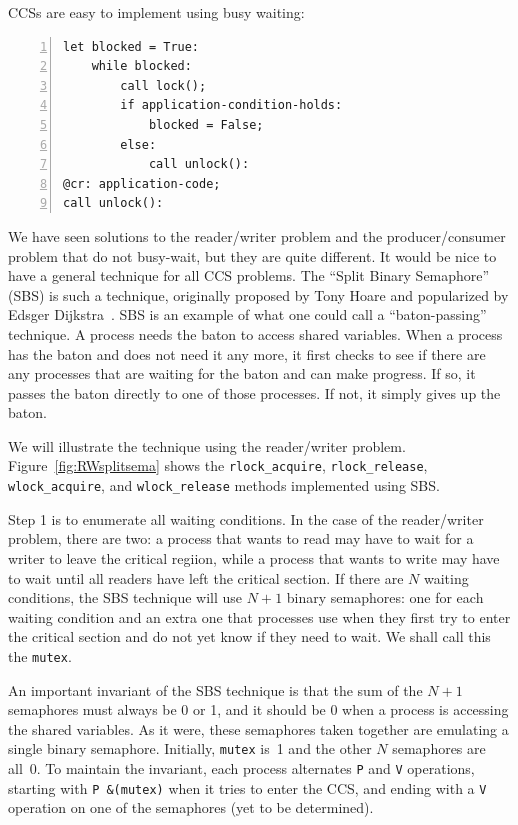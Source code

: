 \documentclass{report}
\newenvironment{code}{
\tcolorbox
}{
\endtcolorbox
}
\begin{document}
CCSs are easy to implement using busy waiting:
\begin{code}
\begin{Verbatim}[xleftmargin=5mm,numbers=left]
let blocked = True:
    while blocked:
        call lock();
        if application-condition-holds:
            blocked = False;
        else:
            call unlock():
@cr: application-code;
call unlock():
\end{Verbatim}
\end{code}

We have seen solutions to the reader/writer problem and the producer/consumer
problem that do not busy-wait, but they are quite different.  It would be nice
to have a general technique for all CCS problems.
The ``Split Binary Semaphore'' (SBS) is such a technique, originally proposed by
Tony Hoare and popularized by Edsger Dijkstra~\cite{EWD703}.
SBS is an example of what one could call a ``baton-passing'' technique.
A process needs the baton to access shared variables.
When a process has the baton and does not need it any more,
it first checks to see if there are any processes that are waiting for the
baton and can make progress.
If so, it passes the baton directly to one of those processes.
If not, it simply gives up the baton.

We will illustrate the technique using the reader/writer problem.
Figure~\ref{fig:RWsplitsema} shows the
\texttt{rlock\_acquire}, \texttt{rlock\_release},
\texttt{wlock\_acquire}, and \texttt{wlock\_release} methods implemented using
SBS.

Step 1 is to enumerate all waiting conditions.  In the case of the reader/writer
problem, there are two: a process that wants to read may have to wait for a
writer to leave the critical regiion, while a process that wants to write may
have to wait until all readers have left the critical section.  If there are $N$
waiting conditions, the SBS technique will use $N+1$ binary semaphores: one for
each waiting condition and an extra one that processes use when they first try
to enter the critical section and do not yet know if they need to wait.
We shall call this the \texttt{mutex}.

An important invariant of the SBS technique is that the sum of the $N+1$ semaphores
must always be 0 or 1, and it should be 0 when a process is accessing the shared
variables.
As it were, these semaphores taken together are emulating a single binary semaphore.
Initially, \texttt{mutex} is~1 and the other $N$ semaphores
are all~0.  To maintain the invariant, each process alternates \texttt{P} and
\texttt{V} operations, starting with \texttt{P~\&(mutex)} when it tries to
enter the CCS, and ending with a \texttt{V} operation on one of the semaphores
(yet to be determined).
\end{document}
